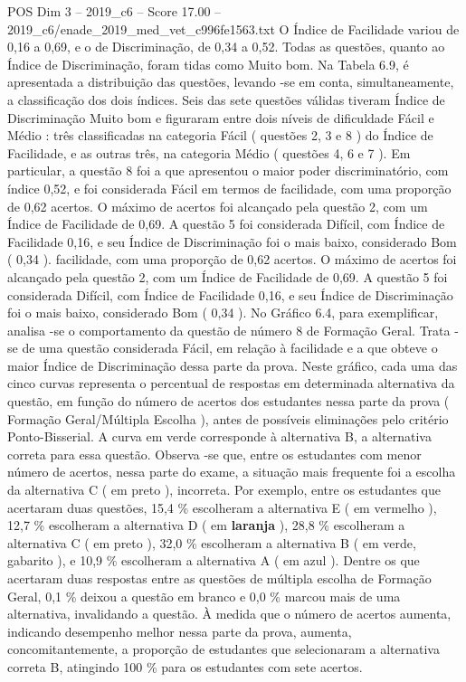 \begin{textsample}{POS Dim 3 – 2019\_c6 – Score 17.00 – 2019\_c6/enade\_2019\_med\_vet\_c996fe1563.txt}
O Índice de Facilidade variou de 0,16 a 0,69, e o de Discriminação, de 0,34 a 0,52.
Todas as questões, quanto ao Índice de Discriminação, foram tidas como Muito bom.
Na Tabela 6.9, é apresentada a distribuição das questões, levando -se em conta, simultaneamente, a classificação dos dois índices.
Seis das sete questões válidas tiveram Índice de Discriminação Muito bom e figuraram entre dois níveis de dificuldade Fácil e Médio : três classificadas na categoria Fácil ( questões 2, 3 e 8 ) do Índice de Facilidade, e as outras três, na categoria Médio ( questões 4, 6 e 7 ).
Em particular, a questão 8 foi a que apresentou o maior poder discriminatório, com índice 0,52, e foi considerada Fácil em termos de facilidade, com uma proporção de 0,62 acertos.
O máximo de acertos foi alcançado pela questão 2, com um Índice de Facilidade de 0,69.
A questão 5 foi considerada Difícil, com Índice de Facilidade 0,16, e seu Índice de Discriminação foi o mais baixo, considerado Bom ( 0,34 ). facilidade, com uma proporção de 0,62 acertos.
O máximo de acertos foi alcançado pela questão 2, com um Índice de Facilidade de 0,69.
A questão 5 foi considerada Difícil, com Índice de Facilidade 0,16, e seu Índice de Discriminação foi o mais baixo, considerado Bom ( 0,34 ).
No Gráfico 6.4, para exemplificar, analisa -se o comportamento da questão de número 8 de Formação Geral.
Trata -se de uma questão considerada Fácil, em relação à facilidade e a que obteve o maior Índice de Discriminação dessa parte da prova.
Neste gráfico, cada uma das cinco curvas representa o percentual de respostas em determinada alternativa da questão, em função do número de acertos dos estudantes nessa parte da prova ( Formação Geral/Múltipla Escolha ), antes de possíveis eliminações pelo critério Ponto-Bisserial.
A curva em verde corresponde à alternativa B, a alternativa correta para essa questão.
Observa -se que, entre os estudantes com menor número de acertos, nessa parte do exame, a situação mais frequente foi a escolha da alternativa C ( em preto ), incorreta.
Por exemplo, entre os estudantes que acertaram duas questões, 15,4 \% escolheram a alternativa E ( em vermelho ), 12,7 \% escolheram a alternativa D ( em \textbf{laranja} ), 28,8 \% escolheram a alternativa C ( em preto ), 32,0 \% escolheram a alternativa B ( em verde, gabarito ), e 10,9 \% escolheram a alternativa A ( em azul ).
Dentre os que acertaram duas respostas entre as questões de múltipla escolha de Formação Geral, 0,1 \% deixou a questão em branco e 0,0 \% marcou mais de uma alternativa, invalidando a questão.
À medida que o número de acertos aumenta, indicando desempenho melhor nessa parte da prova, aumenta, concomitantemente, a proporção de estudantes que selecionaram a alternativa correta B, atingindo 100 \% para os estudantes com sete acertos.

\end{textsample}
